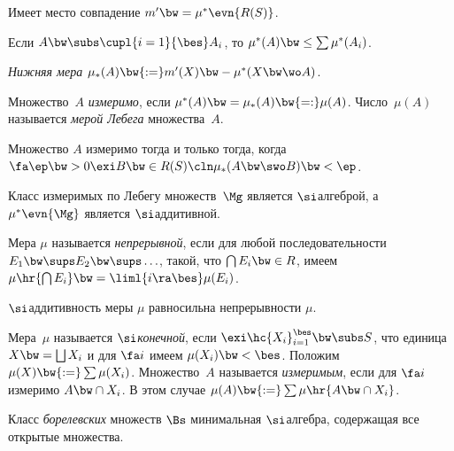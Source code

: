 \documentclass[a4paper]{article}
\begin{document}
\begin{stm}
  Имеет место совпадение $m' \bw= \mu^*\evn{R(S)}$.
\end{stm}

\begin{theorem}
  Если $A \bw\subs \cupl{i=1}{\bes}A_i$, то $\mu^*(A) \bw\le \sum\mu^*(A_i)$.
\end{theorem}

\begin{df}
  \emph{Нижняя мера} $\mu_*(A) \bw{:=} m'(X) \bw- \mu^*(X \bw\wo A)$.
\end{df}

\begin{df}
  Множество~$A$ \emph{измеримо}, если $\mu^*(A) \bw= \mu_*(A) \bw{=:} \mu(A)$.
  Число~$\mu(A)$ называется \emph{мерой Лебега} множества~$A$.
\end{df}

\begin{theorem}
  Множество $A$ измеримо тогда и только тогда, когда
  $\fa\ep \bw> 0 \exi B \bw\in R(S)\cln \mu_*(A\bw\swo B) \bw< \ep$.
\end{theorem}

\begin{theorem}
  Класс измеримых по Лебегу множеств~$\Mg$ является $\si$\д алгеброй,
  а $\mu^*\evn{\Mg}$ является $\si$\д аддитивной.
\end{theorem}

\begin{df}
  Мера $\mu$ называется \emph{непрерывной}, если для любой последовательности
  $E_1 \bw\sups E_2 \bw\sups \ldots$, такой, что $\bigcap E_i \bw\in R$, имеем
  $\mu\hr{\bigcap E_i} \bw= \liml{i\ra\bes} \mu(E_i)$.
\end{df}

\begin{theorem}
  $\si$\д аддитивность меры $\mu$ равносильна непрерывности $\mu$.
\end{theorem}

\begin{df}
  Мера~$\mu$ называется \emph{$\si$\д конечной}, если $\exi\hc{X_i}_{i=1}^\bes \bw\subs S$, что
  единица $X \bw= \bigsqcup X_i$ и
  для $\fa i$ имеем $\mu(X_i) \bw< \bes$. Положим $\mu(X) \bw{:=} \sum \mu(X_i)$.
  Множество~$A$ называется \emph{измеримым}, если для $\fa i$ измеримо $A \bw\cap X_i$.
  В этом случае $\mu(A) \bw{:=} \sum\mu\hr{A\bw\cap X_i}$.
\end{df}

\begin{df}
  Класс \emph{борелевских} множеств $\Bs$\т
  минимальная $\si$\д алгебра, содержащая все открытые множества.
\end{df}
\end{document}
